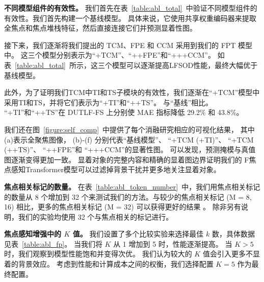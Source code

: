 \textbf{不同模型组件的有效性。}
我们首先在表~\ref{table:abl_total}~中验证不同模型组件的有效性。我们首先构建一个基线模型。 具体来说，它使用共享权重编码器来提取全焦点和焦点堆栈特征，然后直接连接它们并预测显着性图。 
%
%
%
%
\par
%
%
%
接下来，我们逐渐将我们提出的 TCM、FPE 和 CCM 采用到我们的 FPT 模型中。 这三个模型分别表示为“+TCM”、“++FPE”和“+++CCM”。 
如表~\ref{table:abl_total}~所示，这三个模型可以逐渐提高LFSOD性能，最终大幅优于基线模型。 
%
%
%
%
\par
%
%
%
此外，为了证明我们TCM中TI和TS子模块的有效性，我们逐渐在“+TCM”模型中采用TI和TS，并将它们表示为“+TI”和“++TS”。 与“基线”相比。 “+TI”和“++TS”在 DUTLF-FS 上分别使 MAE 指标降低 29.2\% 和 43.8\%。 
%
%
%
%
%
%
\par
%
%
%
%
%
%
%
我们还在图~\ref{figure:self_comp}~中提供了每个消融研究相应的可视化结果，
其中(a)表示全聚焦图像，
	(b)-(f) 分别代表“基线模型”、
	“+TCM (+TI)”、
	“+TCM (++TS)”、
	“++FPE”和
	“+++CCM”的显著性图。
可以发现，预测掩模与真值图逐渐变得更加一致。 显着对象的完整内容和精确的显着图边界证明我们的 F焦点感知Transformer模型可以过滤掉背景干扰并更多地关注显着对象。 
%
%
%
%
%
\par
%
%
%
\textbf{焦点相关标记的数量。} 
在表~\ref{table:abl_token_number}~中，我们用焦点相关标记的数量从 8 个增加到 32 个来测试我们的方法。与较少的焦点相关标记 (M = 8, 16) 相比，更多的焦点相关标记 (M = 32) 可以获得更好的结果 。 除非另有说明，我们的实验均使用 32 个与焦点相关的标记进行。 
%
%
%
%
%
\par
%
%
\textbf{焦点感知增强中的 $K$ 值。 }
我们设置了多个比较实验来选择最佳 $k$ 数，具体数据见表~\ref{table:abl_fp}。
当我们将 $K$ 从 1 增加到 5 时，性能逐渐提高。 当 $K > 5$ 时，我们观察到模型性能饱和并变得次优。 我们认为较大的 $K$ 值会引入更多不显着的背景效应。 考虑到性能和计算成本之间的权衡，我们选择配置 $K = 5$ 作为最终配置。


